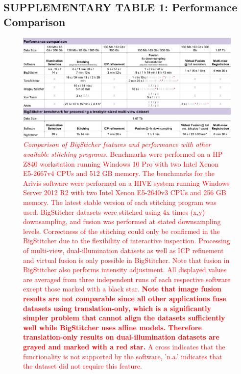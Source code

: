 \documentclass[]{spie}  %
\def\red{\textcolor{red}}
\renewcommand{\figurename}{Supplementary Figure}
\begin{document}
\pagebreak
\begin{landscape}

\setcounter{figure}{0} 
\renewcommand{\figurename}{Supplementary Table}

\subsection*{SUPPLEMENTARY TABLE 1: Performance Comparison}
\begin{figure}[h!]
\center\includegraphics[width=\textwidth+5.00cm]{supp_table_1.pdf}
\vspace{0.5mm}
\caption{\hspace{-0.5mm} \red{\emph{Comparison of BigSticher features and performance with other available stitching programs.} Benchmarks were performed on a HP Z840 workstation running Windows 10 Pro with two Intel Xenon E5-2667v4 CPUs and 512 GB memory. The benchmarks for the Arivis software were performed on a HIVE system running Windows Server 2012 R2 with two Intel Xenon E5-2640v3 CPUs and 256 GB memory. The latest stable version of each stitching program was used. BigStitcher datasets were stitched using 4x times (x,y) downsampling, and fusion was performed at stated downsampling levels. Correctness of the stitching could only be confirmed in the BigStitcher due to the flexibility of interactive inspection. Processing of multi-view, dual-illumination datasets as well as ICP refinement and virtual fusion is only possible in BigStitcher. Note that fusion in BigStitcher also performs intensity adjustment. All displayed values are averaged from three independent runs of each respective software except those marked with a black star. \textbf{Note that image fusion results are not comparable since all other applications fuse datasets using translation-only, which is a significantly simpler problem that cannot align the datasets sufficiently well while BigStitcher uses affine models. Therefore translation-only results on dual-illumination datasets are grayed and marked with a red star.} A cross indicates that the functionality is not supported by the software, 'n.a.' indicates that the dataset did not require this feature.}
}
\label{tab:benchmarks}
\end{figure}



\end{landscape}
\end{document}
